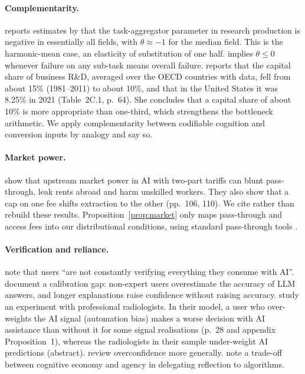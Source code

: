 \documentclass[12pt]{article}
\theoremstyle{remark}
\begin{document}
\paragraph{Complementarity.} \citet[p.~55]{jones2026rd} reports estimates by \citet{ahmadpoor2019decoding} that the task-aggregator parameter in research production is negative in essentially all fields, with $\theta\approx-1$ for the median field. This is the harmonic-mean case, an elasticity of substitution of one half. \citet{kremer1993oring} implies $\theta\le0$ whenever failure on any sub-task means overall failure. \citet[pp.~63--64]{hall2026comment} reports that the capital share of business R\&D, averaged over the OECD countries with data, fell from about 15\% (1981--2011) to about 10\%, and that in the United States it was 8.25\% in 2021 (Table~2C.1, p.~64). She concludes that a capital share of about 10\% is more appropriate than one-third, which strengthens the bottleneck arithmetic. We apply complementarity between codifiable cognition and conversion inputs by analogy and say so.

\paragraph{Market power.} \citet{athey2026competition} show that upstream market power in AI with two-part tariffs can blunt pass-through, leak rents abroad and harm unskilled workers. They also show that a cap on one fee shifts extraction to the other (pp.~106, 110). We cite rather than rebuild these results. Proposition~\ref{prop:market} only maps pass-through and access fees into our distributional conditions, using standard pass-through tools \citep{weyl2013passthrough}.

\paragraph{Verification and reliance.} \citet[p.~383]{stiglitz2026information} note that users ``are not constantly verifying everything they consume with AI''. \citet{steyvers2025know} document a calibration gap: non-expert users overestimate the accuracy of LLM answers, and longer explanations raise confidence without raising accuracy. \citet{agarwal2023radiology} study an experiment with professional radiologists. In their model, a user who over-weights the AI signal (automation bias) makes a worse decision with AI assistance than without it for some signal realisations (p.~28 and appendix Proposition~1), whereas the radiologists in their sample under-weight AI predictions (abstract). \citet{moore2008overconfidence} review overconfidence more generally. \citet[p.~277, fn.~6]{ludwig2026reflective} note a trade-off between cognitive economy and agency in delegating reflection to algorithms.
\end{document}
